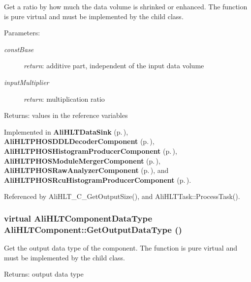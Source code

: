 Get a ratio by how much the data volume is shrinked or enhanced. The function is pure virtual and must be implemented by the child class. \begin{Desc}
\item[Parameters:]
\begin{description}
\item[{\em const\-Base}]{\em return\/}: additive part, independent of the input data volume \item[{\em input\-Multiplier}]{\em return\/}: multiplication ratio \end{description}
\end{Desc}
\begin{Desc}
\item[Returns:]values in the reference variables \end{Desc}


Implemented in {\bf Ali\-HLTData\-Sink} {\rm (p.\,\pageref{classAliHLTDataSink_a5})}, {\bf Ali\-HLTPHOSDDLDecoder\-Component} {\rm (p.\,\pageref{classAliHLTPHOSDDLDecoderComponent_a13})}, {\bf Ali\-HLTPHOSHistogram\-Producer\-Component} {\rm (p.\,\pageref{classAliHLTPHOSHistogramProducerComponent_a13})}, {\bf Ali\-HLTPHOSModule\-Merger\-Component} {\rm (p.\,\pageref{classAliHLTPHOSModuleMergerComponent_a13})}, {\bf Ali\-HLTPHOSRaw\-Analyzer\-Component} {\rm (p.\,\pageref{classAliHLTPHOSRawAnalyzerComponent_a15})}, and {\bf Ali\-HLTPHOSRcu\-Histogram\-Producer\-Component} {\rm (p.\,\pageref{classAliHLTPHOSRcuHistogramProducerComponent_a8})}.

Referenced by Ali\-HLT\_\-C\_\-Get\-Output\-Size(), and Ali\-HLTTask::Process\-Task().
\subsubsection{\setlength{\rightskip}{0pt plus 5cm}virtual {\bf Ali\-HLTComponent\-Data\-Type} Ali\-HLTComponent::Get\-Output\-Data\-Type ()\hspace{0.3cm}{\tt  [pure virtual]}}\label{classAliHLTComponent_a11}


Get the output data type of the component. The function is pure virtual and must be implemented by the child class. \begin{Desc}
\item[Returns:]output data type \end{Desc}


